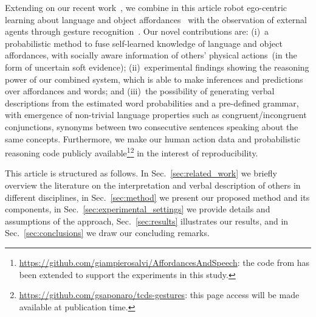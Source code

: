Extending on our recent work~\cite{saponaro:2017:glu}, we combine in this article robot ego-centric learning about language and object affordances~\cite{salvi:2012:smcb} with the observation of external agents through gesture recognition~\cite{saponaro:2013:crhri}.
Our novel contributions are:
(i)~a probabilistic method to fuse self-learned knowledge of language and object affordances, with socially aware information of others' physical actions~(in the form of uncertain soft evidence);
(ii)~experimental findings showing the reasoning power of our combined system, which is able to make inferences and predictions over affordances and words; and
(iii)~the possibility of generating verbal descriptions from the estimated word probabilities and a pre-defined grammar, with emergence of non-trivial language properties such as congruent/incongruent conjunctions, synonyms between two consecutive sentences speaking about the same concepts.
Furthermore, we make our human action data and probabilistic reasoning code publicly available\footnote{\url{https://github.com/giampierosalvi/AffordancesAndSpeech}: the code from \cite{salvi:2012:smcb} has been extended to support the experiments in this study.}\footnote{\url{https://github.com/gsaponaro/tcds-gestures}: this page access will be made available at publication time.} in the interest of reproducibility.

This article is structured as follows.
In Sec.~\ref{sec:related_work} we briefly overview the literature on the interpretation and verbal description of others in different disciplines,
in Sec.~\ref{sec:method} we present our proposed method and its components,
in Sec.~\ref{sec:experimental_settings} we provide details and assumptions of the approach,
Sec.~\ref{sec:results} illustrates our results, and
in Sec.~\ref{sec:conclusions} we draw our concluding remarks.
